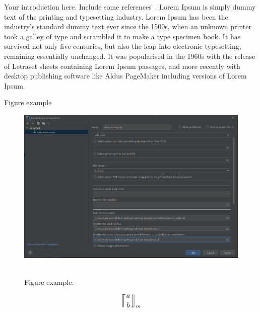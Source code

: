 Your introduction here.
Include some references~\cite{bayour2017truly,benkhettou2016conformable,caputo2009time,martins2009calculus,
    GithubSource_2022, Sloane_theencyclopedia}.
Lorem Ipsum is simply dummy text of the printing and typesetting industry.
Lorem Ipsum has been the industry's standard dummy text ever since the 1500s, when an unknown printer took a galley
of type and scrambled it to make a type specimen book.
It has survived not only five centuries, but also the leap into electronic typesetting, remaining essentially unchanged.
It was popularised in the 1960s with the release of Letraset sheets containing Lorem Ipsum passages, and more
recently with desktop publishing software like Aldus PageMaker including versions of Lorem Ipsum.

Figure example
\begin{figure}[H]
    \centering
    \includegraphics[width=1\textwidth]{../img/latex_configuration}
    ~\caption{Figure example.}\label{fig:figure}
\end{figure}

\begin{equation*}
     \llceil \nobarfrac{a}{b} \rrfloor_{m}
\end{equation*}